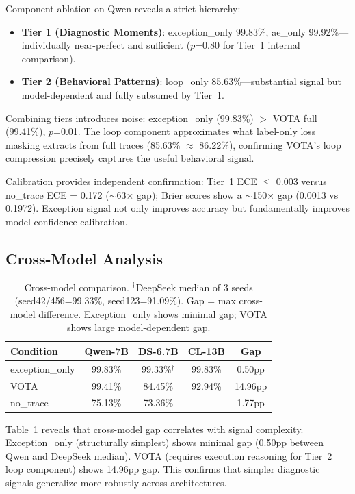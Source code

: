 \documentclass[11pt,a4paper]{article}
\begin{document}
Component ablation on Qwen reveals a strict hierarchy:

\begin{itemize}
    \item \textbf{Tier 1 (Diagnostic Moments)}: exception\_only 99.83\%, ae\_only 99.92\%---individually near-perfect and sufficient ($p$=0.80 for Tier~1 internal comparison).
    \item \textbf{Tier 2 (Behavioral Patterns)}: loop\_only 85.63\%---substantial signal but model-dependent and fully subsumed by Tier~1.
\end{itemize}

Combining tiers introduces noise: exception\_only (99.83\%) $>$ VOTA full (99.41\%), $p$=0.01. The loop component approximates what label-only loss masking extracts from full traces (85.63\% $\approx$ 86.22\%), confirming VOTA's loop compression precisely captures the useful behavioral signal.

Calibration provides independent confirmation: Tier~1 ECE $\leq$ 0.003 versus no\_trace ECE = 0.172 ($\sim$63$\times$ gap); Brier scores show a $\sim$150$\times$ gap (0.0013 vs 0.1972). Exception signal not only improves accuracy but fundamentally improves model confidence calibration.

\subsection{Cross-Model Analysis}

\begin{table}[t]
\centering
\small
\begin{tabular}{lcccc}
\toprule
\textbf{Condition} & \textbf{Qwen-7B} & \textbf{DS-6.7B} & \textbf{CL-13B} & \textbf{Gap} \\
\midrule
exception\_only & 99.83\% & 99.33\%$^\dagger$ & 99.83\% & 0.50pp \\
VOTA & 99.41\% & 84.45\% & 92.94\% & 14.96pp \\
no\_trace & 75.13\% & 73.36\% & --- & 1.77pp \\
\bottomrule
\end{tabular}
\caption{Cross-model comparison. $^\dagger$DeepSeek median of 3 seeds (seed42/456=99.33\%, seed123=91.09\%). Gap = max cross-model difference. Exception\_only shows minimal gap; VOTA shows large model-dependent gap.}
\label{tab:cross_model}
\end{table}

Table~\ref{tab:cross_model} reveals that cross-model gap correlates with signal complexity. Exception\_only (structurally simplest) shows minimal gap (0.50pp between Qwen and DeepSeek median). VOTA (requires execution reasoning for Tier~2 loop component) shows 14.96pp gap. This confirms that simpler diagnostic signals generalize more robustly across architectures.
\end{document}
